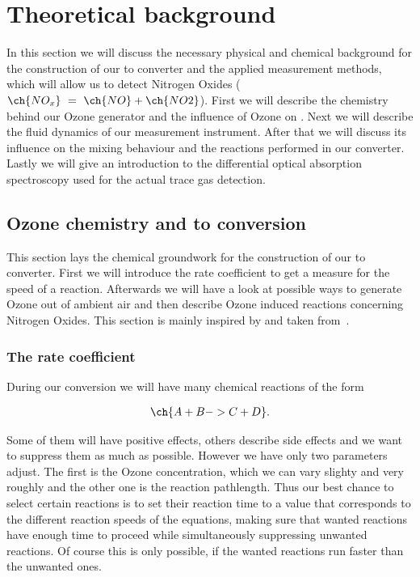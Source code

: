 \section{Theoretical background}
\label{sec:theory}

In this section we will discuss the necessary physical and chemical
background for the construction of our  to  converter
and the applied measurement methods, which will allow us to detect
Nitrogen Oxides ($\ch{NO_x}\ =\ \ch{NO} + \ch{NO2}$). First we will
describe the chemistry behind our Ozone generator and the influence of
Ozone on . Next we will describe the fluid dynamics of our
measurement instrument. After that we will discuss its influence on
the mixing behaviour and the reactions performed in our
converter. Lastly we will give an introduction to the differential
optical absorption spectroscopy used for the actual trace gas
detection.

\subsection{Ozone chemistry and  to  conversion}
\label{sec:chemistry}

This section lays the chemical groundwork for the construction of our
 to  converter. First we will introduce the rate
coefficient to get a measure for the speed of a reaction. Afterwards
we will have a look at possible ways to generate Ozone out of ambient
air and then describe Ozone induced reactions concerning
Nitrogen Oxides. This section is mainly inspired by and taken
from~\cite{bsc}.

\subsubsection{The rate coefficient}
\label{sec:rate}

During our conversion we will have many chemical reactions of the form

\begin{align*}
  \ch{A + B -> C + D}.
\end{align*}

Some of them will have positive effects, others describe side
effects and we want to suppress them as much as possible. However we
have only two parameters adjust. The first is the Ozone
concentration, which we can vary slighty and very roughly and the
other one is the reaction pathlength. Thus our best chance to
select certain reactions is to set their reaction time to a value that
corresponds to the different reaction speeds of the equations, making
sure that wanted reactions have enough time to proceed while
simultaneously suppressing unwanted reactions. Of
course this is only possible, if the wanted reactions run faster than
the unwanted ones.

